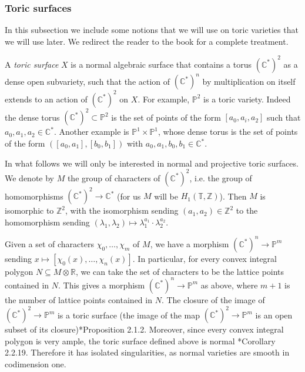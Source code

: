 \documentclass[11pt]{article} %
\theoremstyle{definition}
\newcommand{\Z}{{\mathbb Z}}
\newcommand{\C}{{\mathbb C}}
\newcommand{\T}{{\mathbb T}}
\renewcommand{\P}{{\mathbb P}}
\newcommand{\green}[1]{{\color{calpolypomonagreen} #1}}
\begin{document}
\subsubsection{Toric surfaces}\label{subsection_toric_surfaces}
In this subsection we include some notions that we will use on toric varieties that we will use later. We redirect the reader to the book \cite{CLS11} for a complete treatment.

A \textit{toric surface} $X$ is a normal algebraic surface that contains a torus $(\C^*)^2$ as a dense open subvariety, such that the action of $(\mathbb{C}^{* })^{n}$ by multiplication on itself extends to an action of $(\mathbb{C}^{*})^{2}$ on $X$. For example, $\mathbb{P}^2$ is a toric variety. Indeed the dense torus $(\C^*)^2 \subset \mathbb{P}^2$ is the set of points of the form $[a_0,a_i,a_2]$ such that $a_0,a_1,a_2 \in \C^*$. Another example is $\P^1 \times \P^1$, whose dense torus is the set of points of the form $([a_0,a_1],[b_0,b_1])$ with $a_0,a_1,b_0,b_1 \in \C^*$.

In what follows we will only be interested in normal and projective toric surfaces. We denote by $M$ the group of characters of $(\mathbb{C}^{*})^{2}$, i.e. the group of homomorphisms $(\mathbb{C}^{*})^{2} \to \mathbb{C}^{*}$ (for us $M$ will be $H_1(\T,\Z)$). Then $M$ is isomorphic to $\mathbb{Z}^2$, with the isomorphism sending $(a_1,a_2) \in \mathbb{Z}^2$ to the homomorphism sending $(\lambda_1,\lambda_2)\mapsto \lambda_1^{a_1}\cdot \lambda_2^{a_2}$.

Given a set of characters $\chi_0,\dots,\chi_m$ of $M$, we have a morphism $(\mathbb{C}^*)^{ n} \to \mathbb{P}^m$ sending $x\mapsto [\chi_0(x),\dots,\chi_n(x)]$. In particular, for every convex integral polygon $N\subseteq M\otimes \mathbb{R}$, we can take the set of characters to be the lattice points contained in $N$. This gives a morphism $(\mathbb{C}^{*})^{ n}\to \mathbb{P}^m$ as above, where $m+1$ is the number of lattice points contained in $N$. The closure of the image of $(\mathbb{C}^{*})^{ 2} \to \mathbb{P}^m$ is a toric surface
(the image of the map $(\mathbb{C}^{*})^{ 2}\to \mathbb{P}^m$ is an open subset of its closure)\cite{CLS11}*{Proposition 2.1.2}. Moreover, since every convex integral polygon is very ample, the toric surface defined above is normal \cite{CLS11}*{Corollary 2.2.19}. Therefore it has isolated singularities, as normal varieties are smooth in codimension one. %
\end{document}

